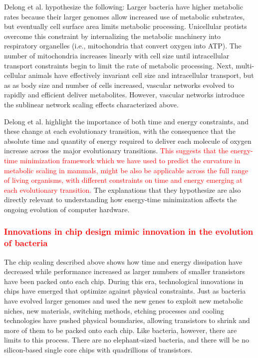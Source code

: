 \documentclass[12pt]{article}
\newcommand{\red}[1]{\textcolor{red}{#1}}
\begin{document}
Delong et al. hypothesize the following: Larger bacteria have higher metabolic rates because their larger genomes allow increased use of
metabolic substrates, but eventually cell surface area limits metabolic
processing. Unicellular protists overcome this constraint by internalizing the metabolic machinery into
respiratory organelles (i.e., mitochondria that convert oxygen into ATP). The
number of mitochondria increases linearly with cell size until intracellular
transport constraints begin to limit the rate of metabolic processing.
Next, multi-cellular
animals have effectively invariant cell size and intracellular transport, but as as body size and number of cells increased, vascular networks evolved to rapidly and efficient deliver metabolites. However, vascular networks introduce the sublinear network scaling effects characterized above. 

Delong et al. highlight the
importance of both time and energy constraints, and these change at each evolutionary transition, with the consequence that the absolute time and quantity of
energy required to deliver each molecule of oxygen increase across the major evolutionary transitions. \red{This suggests that the energy-time minimization framework which we have used to predict the curvature in metabolic scaling in mammals, might be also be applicable across the full range of living organisms, with different constraints on time and energy emerging at each evolutionary transition.} The explanations that they hypothesize are also directly relevant
to understanding how energy-time minimization affects the ongoing evolution of
computer hardware.

\red{\subsubsection{Innovations in chip design mimic innovation in the evolution of bacteria}} The chip scaling described above
shows how time and energy dissipation have decreased while performance
increased as larger numbers of smaller transistors have been packed
onto each chip. During this era, technological innovations in chips
have emerged that optimize against physical constraints.  Just as
bacteria have evolved larger genomes and used the new genes to exploit
new metabolic niches, new materials, switching methods, etching
processes and cooling technologies have pushed physical boundaries,
allowing transistors to shrink and more of them to be packed onto each
chip. Like bacteria, however, there are limits to this process.  There are no elephant-sized bacteria, and there will be no
silicon-based single core chips with quadrillions of transistors.
\end{document}
